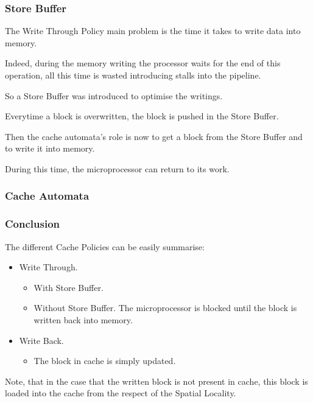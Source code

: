 
\begin{frame}
  \frametitle{Store Buffer}

  The Write Through Policy main problem is the time it takes to write
  data into memory.

  \-

  Indeed, during the memory writing the processor waits for the end of this
  operation, all this time is wasted introducing stalls into the pipeline.

  \-

  So a Store Buffer was introduced to optimise the writings.

  \-

  Everytime a block is overwritten, the block is pushed in the Store Buffer.

  \-

  Then the cache automata's role is now to get a block from the Store Buffer
  and to write it into memory.

  \-

  During this time, the microprocessor can return to its work.
\end{frame}


\begin{frame}
  \frametitle{Cache Automata}

  \begin{center}
  \end{center}
\end{frame}


\begin{frame}
  \frametitle{Conclusion}

  The different Cache Policies can be easily summarise:

  \begin{itemize}
    \item
      Write Through.

      \begin{itemize}
	\item
	  With Store Buffer.
	\item
	  Without Store Buffer. The microprocessor is blocked until the
	  block is written back into memory.
      \end{itemize}

    \item
      Write Back.

      \begin{itemize}
	\item
	  The block in cache is simply updated.
      \end{itemize}
  \end{itemize}

  Note, that in the case that the written block is not present in cache,
  this block is loaded into the cache from the respect of the Spatial
  Locality.
\end{frame}

